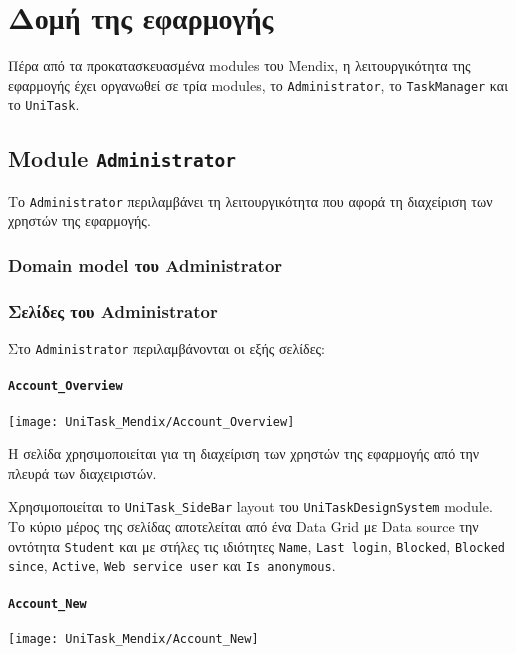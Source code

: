     \section{Δομή της εφαρμογής} \label{sec:unitask_mendix}
        Πέρα από τα προκατασκευασμένα modules του Mendix, η λειτουργικότητα της εφαρμογής έχει οργανωθεί σε τρία modules, το \texttt{Administrator}, το \texttt{TaskManager} και το \texttt{UniTask}.

        \subsection{Module \texttt{Administrator}}
            Το \texttt{Administrator} περιλαμβάνει τη λειτουργικότητα που αφορά τη διαχείριση των χρηστών της εφαρμογής.
            \subsubsection{Domain model του Administrator}

            \subsubsection{Σελίδες του Administrator}
                Στο \texttt{Administrator} περιλαμβάνονται οι εξής σελίδες:
                \paragraph{\texttt{Account\_Overview}}
                    \begin{center}
                        \texttt{[image: UniTask\_Mendix/Account\_Overview]}
                    \end{center}

                    Η σελίδα χρησιμοποιείται για τη διαχείριση των χρηστών της εφαρμογής από την πλευρά των διαχειριστών.

                    Χρησιμοποιείται το \texttt{UniTask\_SideBar} layout του \texttt{UniTaskDesignSystem} module. Το κύριο μέρος της σελίδας αποτελείται από ένα Data Grid με Data source την οντότητα \texttt{Student} και με στήλες τις ιδιότητες \texttt{Name}, \texttt{Last login}, \texttt{Blocked}, \texttt{Blocked since}, \texttt{Active}, \texttt{Web service user} και \texttt{Is anonymous}.

                \paragraph{\texttt{Account\_New}}
                    \begin{center}
                        \texttt{[image: UniTask\_Mendix/Account\_New]}
                    \end{center}

